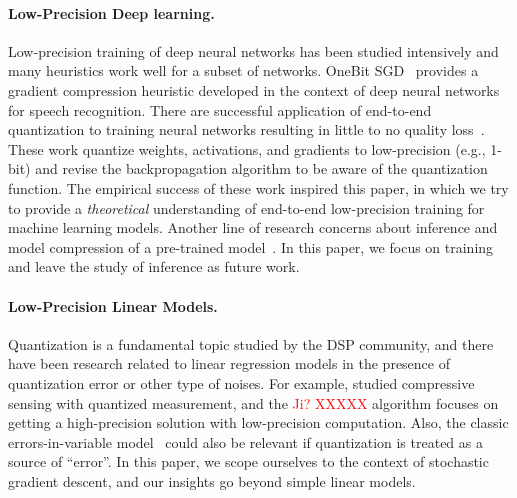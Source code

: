 \documentclass{article}
\begin{document}
\vspace{-1em}
\paragraph{Low-Precision Deep learning.}

Low-precision training of deep neural networks has been studied
intensively and many heuristics work well for a subset of networks.
OneBit SGD~\cite{Frank:2014:Interspeech} provides
a gradient compression heuristic developed in the context of deep 
neural networks for speech recognition. There are successful 
application of end-to-end quantization to training neural networks
resulting in little to no quality loss~\cite{hubara2016quantized,
rastegari2016xnor,zhou2016dorefa,miyashita2016convolutional,li2016ternary,gupta2015deep}. These work quantize weights, activations, and gradients 
to low-precision (e.g., 1-bit) and revise the backpropagation 
algorithm to be aware of the quantization function.
The empirical success of these work inspired this paper, in which we try
to provide a {\em theoretical} understanding of end-to-end low-precision
training for machine learning models.
Another line of research concerns about inference and model
compression of a pre-trained model~\cite{vanhoucke2011improving,gong2014compressing,Han:2016:ICLR,lin2016fixed,kim2016bitwise,kim2015compression,wu2016quantized}.
In this paper, we focus on training and leave the study of
inference as future work.

\vspace{-1em}
\paragraph{Low-Precision Linear Models.}

Quantization is a fundamental topic studied by the
DSP community, and there have been research related to
linear regression models in the presence of quantization
error or other type of noises. For example,
\citet{Gopi:2013:ICML} studied compressive sensing
with quantized measurement, and the \textcolor{red}{Ji? XXXXX}
algorithm focuses on getting a high-precision solution
with low-precision computation. Also, the
classic errors-in-variable model~\cite{Hall:2008:Book}
could also be relevant if quantization is treated 
as a source of ``error''. In this paper, we scope
ourselves to the context of stochastic gradient descent, 
and our insights go beyond simple linear models.

\vspace{-1em}
\end{document}
